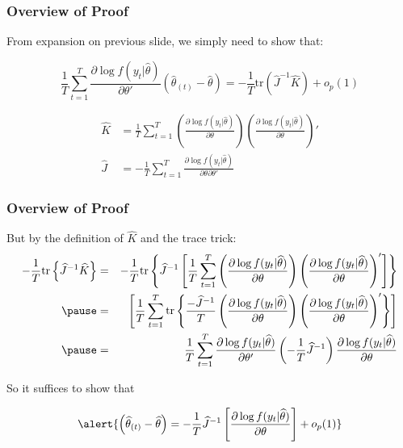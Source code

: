 \begin{frame} 
  \frametitle{Overview of Proof}
  
From expansion on previous slide, we simply need to show that:
\vspace{-1em}

\[\frac{1}{T}\sum_{t=1}^T \frac{\partial \log f(y_t|\widehat{\theta})}{\partial \theta'}\left(\widehat{\theta}_{(t)} - \widehat{\theta} \right) = -\frac{1}{T}\mbox{tr}\left(\widehat{J}^{-1} \widehat{K} \right) + o_p(1)\]

\small
\begin{align*}
  \widehat{K}&= \frac{1}{T}\sum_{t=1}^T \left(\frac{\partial \log f(y_t|\widehat{\theta})}{\partial \theta}\right) \left(\frac{\partial \log f(y_t|\widehat{\theta})}{\partial \theta}\right)' \\
  \widehat{J} &= -\frac{1}{T}\sum_{t=1}^T \frac{\partial\log f(y_t|\widehat{\theta})}{\partial\theta \partial \theta'}
\end{align*}
\end{frame}

\begin{frame}
  \frametitle{Overview of Proof}

But by the definition of $\widehat{K}$ and the trace trick:
\footnotesize
\begin{eqnarray*}
		-\frac{1}{T}\mbox{tr}\left\{\widehat{J}^{-1} \widehat{K} \right\}
		&=& -\frac{1}{T}\mbox{tr}\left\{\widehat{J}^{-1}\left[\frac{1}{T}\sum_{t=1}^T \left(\frac{\partial \log f(y_t|\widehat{\theta})}{\partial \theta}\right) \left(\frac{\partial \log f(y_t|\widehat{\theta})}{\partial \theta}\right) '\right]\right\}\\ \pause
    &=& \left[\frac{1}{T}\sum_{t=1}^T \mbox{tr}\left\{\frac{-\widehat{J}^{-1}}{T}\left(\frac{\partial \log f(y_t|\widehat{\theta})}{\partial \theta}\right) \left(\frac{\partial \log f(y_t|\widehat{\theta})}{\partial \theta}\right) '\right\}\right]\\ \pause
    &=& \frac{1}{T}\sum_{t=1}^T \frac{\partial \log f(y_t|\widehat{\theta})}{\partial \theta'} \left(-\frac{1}{T}\widehat{J}^{-1}\right)\frac{\partial \log f(y_t|\widehat{\theta})}{\partial \theta} 
\end{eqnarray*}

\pause
\normalsize
So it suffices to show that
\vspace{-1em}

\[
  \alert{\left( \widehat{\theta}_{(t)} - \widehat{\theta}  \right) = -\frac{1}{T} \widehat{J}^{-1} \left[\frac{\partial \log f(y_t|\widehat{\theta})}{\partial \theta}\right] + o_p(1)}
\]

\end{frame}
